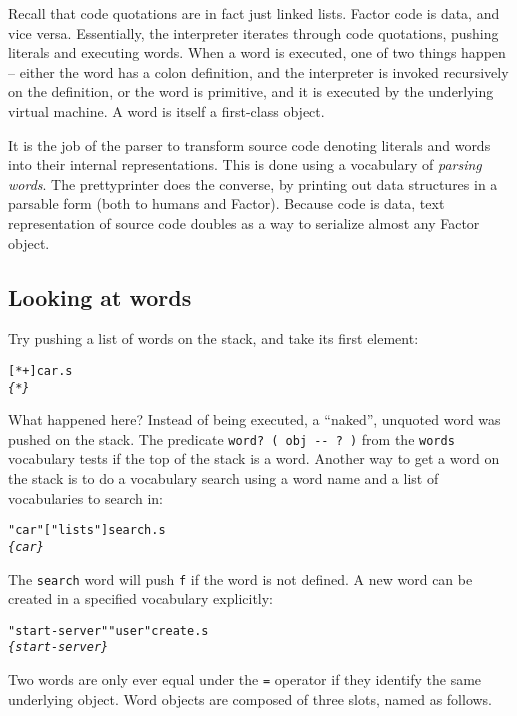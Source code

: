 \documentclass[english]{article}
\begin{document}
Recall that code quotations are in fact just linked lists. Factor code is data, and vice versa. Essentially, the interpreter iterates through code quotations, pushing literals and executing words. When a word is executed, one of two things happen -- either the word has a colon definition, and the interpreter is invoked recursively on the definition, or the word is primitive, and it is executed by the underlying virtual machine. A word is itself a first-class object.

It is the job of the parser to transform source code denoting literals and words into their internal representations. This is done using a vocabulary of \emph{parsing words}. The prettyprinter does the converse, by printing out data structures in a parsable form (both to humans and Factor). Because code is data, text representation of source code doubles as a way to serialize almost any Factor object.

\subsection{Looking at words}

Try pushing a list of words on the stack, and take its first element:

\begin{alltt}
{[} * + {]} car .s
\emph{\{ * \}}
\end{alltt}

What happened here? Instead of being executed, a ``naked'', unquoted word was pushed on the stack. The predicate \texttt{word? ( obj -{}- ? )} from the \texttt{words} vocabulary tests if the top of the stack is a word. Another way to get a word on the stack is to do a vocabulary search using a word name and a list of vocabularies to search in:

\begin{alltt}
"car" {[} "lists" {]} search .s
\emph{\{ car \}}
\end{alltt}

The \texttt{search} word will push \texttt{f} if the word is not defined. A new word can be created in a specified vocabulary explicitly:

\begin{alltt}
"start-server" "user" create .s
\emph{\{ start-server \}}
\end{alltt}

Two words are only ever equal under the \texttt{=} operator if they identify the same underlying object. Word objects are composed of three slots, named as follows.
\end{document}
